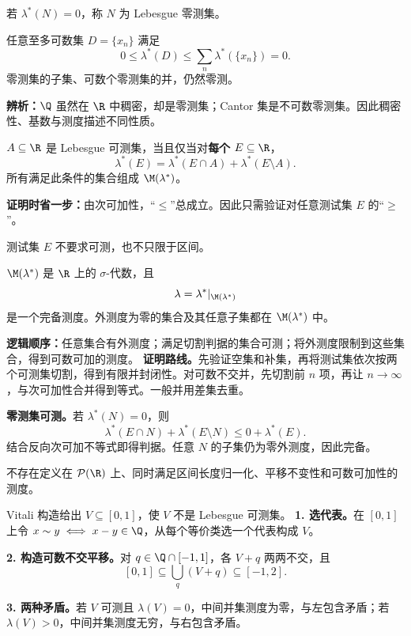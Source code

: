 若 $\lambda^*(N)=0$，称 $N$ 为 Lebesgue 零测集。

任意至多可数集 $D=\{x_n\}$ 满足
\[
0\le\lambda^*(D)
\le\sum_n\lambda^*(\{x_n\})=0.
\]
零测集的子集、可数个零测集的并，仍然零测。

\textbf{辨析：}$\Q$ 虽然在 $\R$ 中稠密，却是零测集；Cantor 集是不可数零测集。因此稠密性、基数与测度描述不同性质。

$A\subseteq\R$ 是 Lebesgue 可测集，当且仅当对\textbf{每个} $E\subseteq\R$，
\[
\lambda^*(E)=
\lambda^*(E\cap A)+\lambda^*(E\setminus A).
\]
所有满足此条件的集合组成 $\M(\lambda^*)$。

\textbf{证明时省一步：}由次可加性，“$\le$”总成立。因此只需验证对任意测试集 $E$ 的“$\ge$”。

测试集 $E$ 不要求可测，也不只限于区间。

$\M(\lambda^*)$ 是 $\R$ 上的 $\sigma$-代数，且
\[
\lambda=\lambda^*|_{\M(\lambda^*)}
\]
是一个完备测度。外测度为零的集合及其任意子集都在 $\M(\lambda^*)$ 中。

\textbf{逻辑顺序：}任意集合有外测度；满足切割判据的集合可测；将外测度限制到这些集合，得到可数可加的测度。
\textbf{证明路线。}先验证空集和补集，再将测试集依次按两个可测集切割，得到有限并封闭性。对可数不交并，先切割前 $n$ 项，再让 $n\to\infty$，与次可加性合并得到等式。一般并用差集去重。

\textbf{零测集可测。}若 $\lambda^*(N)=0$，则
\[
\lambda^*(E\cap N)+\lambda^*(E\setminus N)
\le0+\lambda^*(E).
\]
结合反向次可加不等式即得判据。任意 $N$ 的子集仍为零外测度，因此完备。

不存在定义在 $\mathcal P(\R)$ 上、同时满足区间长度归一化、平移不变性和可数可加性的测度。

Vitali 构造给出 $V\subseteq[0,1]$，使 $V$ 不是 Lebesgue 可测集。
\textbf{1. 选代表。}在 $[0,1]$ 上令 $x\sim y\iff x-y\in\Q$，从每个等价类选一个代表构成 $V$。

\textbf{2. 构造可数不交平移。}对 $q\in\Q\cap[-1,1]$，各 $V+q$ 两两不交，且
\[
[0,1]\subseteq\bigcup_q(V+q)\subseteq[-1,2].
\]

\textbf{3. 两种矛盾。}若 $V$ 可测且 $\lambda(V)=0$，中间并集测度为零，与左包含矛盾；若 $\lambda(V)>0$，中间并集测度无穷，与右包含矛盾。
